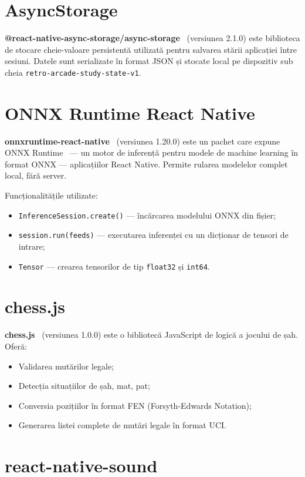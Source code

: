 \documentclass[12pt, a4paper, twoside]{report}
\numberwithin{equation}{section}
\begin{document}
\section{AsyncStorage}

\textbf{@react-native-async-storage/async-storage}~\cite{asyncstorage} (versiunea 2.1.0) este biblioteca
de stocare cheie-valoare persistentă utilizată pentru salvarea stării aplicației între
sesiuni. Datele sunt serializate în format JSON și stocate local pe dispozitiv sub cheia
\texttt{retro-arcade-study-state-v1}.

\section{ONNX Runtime React Native}

\textbf{onnxruntime-react-native}~\cite{onnxruntime} (versiunea 1.20.0) este un pachet care expune
ONNX Runtime~\cite{onnxformat} — un motor de inferență pentru modele de machine learning în format ONNX
— aplicațiilor React Native. Permite rularea modelelor complet local, fără server.

Funcționalitățile utilizate:
\begin{itemize}
  \item \texttt{InferenceSession.create()} — încărcarea modelului ONNX din fișier;
  \item \texttt{session.run(feeds)} — executarea inferenței cu un dicționar de tensori
    de intrare;
  \item \texttt{Tensor} — crearea tensorilor de tip \texttt{float32} și \texttt{int64}.
\end{itemize}

\section{chess.js}

\textbf{chess.js}~\cite{chessjs} (versiunea 1.0.0) este o bibliotecă JavaScript de logică a jocului
de șah. Oferă:
\begin{itemize}
  \item Validarea mutărilor legale;
  \item Detecția situațiilor de șah, mat, pat;
  \item Conversia pozițiilor în format FEN (Forsyth-Edwards Notation);
  \item Generarea listei complete de mutări legale în format UCI.
\end{itemize}

\section{react-native-sound}
\end{document}
